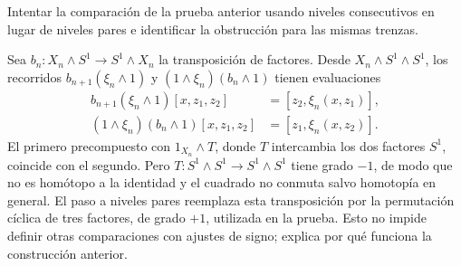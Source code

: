 \begin{ejer}
Intentar la comparación de la prueba anterior usando niveles consecutivos en lugar de niveles pares e identificar la obstrucción para las mismas trenzas.
\end{ejer}
\begin{sol}
Sea $b_n\colon X_n\wedge S^1\to S^1\wedge X_n$ la transposición de factores. Desde $X_n\wedge S^1\wedge S^1$, los recorridos $b_{n+1}(\xi_n\wedge1)$ y $(1\wedge\xi_n)(b_n\wedge1)$ tienen evaluaciones
\[
\begin{aligned}
b_{n+1}(\xi_n\wedge1)[x,z_1,z_2]&=[z_2,\xi_n(x,z_1)],\\
(1\wedge\xi_n)(b_n\wedge1)[x,z_1,z_2]&=[z_1,\xi_n(x,z_2)].
\end{aligned}
\]
El primero precompuesto con $1_{X_n}\wedge T$, donde $T$ intercambia los dos factores $S^1$, coincide con el segundo. Pero $T\colon S^1\wedge S^1\to S^1\wedge S^1$ tiene grado $-1$, de modo que no es homótopo a la identidad y el cuadrado no conmuta salvo homotopía en general. El paso a niveles pares reemplaza esta transposición por la permutación cíclica de tres factores, de grado $+1$, utilizada en la prueba. Esto no impide definir otras comparaciones con ajustes de signo; explica por qué funciona la construcción anterior.
\end{sol}

